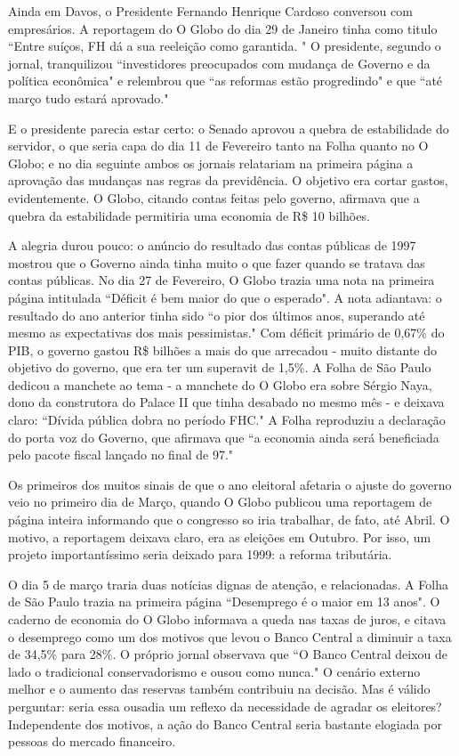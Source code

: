 \documentclass{article}
\begin{document}
Ainda em Davos, o Presidente Fernando Henrique Cardoso conversou com empresários. A reportagem do O Globo do dia 29 de Janeiro tinha como titulo ``Entre suíços, FH dá a sua reeleição como garantida. " O presidente, segundo o jornal, tranquilizou ``investidores preocupados com mudança de Governo e da política econômica" e relembrou que ``as reformas estão progredindo" e que ``até março tudo estará aprovado."

E o presidente parecia estar certo: o Senado aprovou a quebra de estabilidade do servidor, o que seria capa do dia 11 de Fevereiro tanto na Folha quanto no O Globo; e no dia seguinte ambos os jornais relatariam na primeira página a aprovação das mudanças nas regras da previdência. O objetivo era cortar gastos, evidentemente. O Globo, citando contas feitas pelo governo, afirmava que a quebra da estabilidade permitiria uma economia de R\$ 10 bilhões.                     

A alegria durou pouco: o anúncio do resultado das contas públicas de 1997 mostrou que o Governo ainda tinha muito o que fazer quando se tratava das contas públicas. No dia 27 de Fevereiro, O Globo trazia uma nota na primeira página intitulada ``Déficit é bem maior do que o esperado". A nota adiantava: o resultado do ano anterior tinha sido ``o pior dos últimos anos, superando até mesmo as expectativas dos mais pessimistas." Com déficit primário de 0,67\% do PIB, o governo gastou R\$ bilhões a mais do que arrecadou - muito distante do objetivo do governo, que era ter um superavit de 1,5\%. A Folha de São Paulo dedicou a manchete ao tema - a manchete do O Globo era sobre Sérgio Naya, dono da construtora do Palace II que tinha desabado no mesmo mês - e deixava claro: ``Dívida pública dobra no período FHC." A Folha reproduziu a declaração do porta voz do Governo, que afirmava que ``a economia ainda será beneficiada pelo pacote fiscal lançado no final de 97."

Os primeiros dos muitos sinais de que o ano eleitoral afetaria o ajuste do governo veio no primeiro dia de Março, quando O Globo publicou uma reportagem de página inteira informando que o congresso so iria trabalhar, de fato, até Abril. O motivo, a reportagem deixava claro, era as eleições em Outubro. Por isso, um projeto importantíssimo seria deixado para 1999: a reforma tributária.

O dia 5 de março traria duas notícias dignas de atenção, e relacionadas. A Folha de São Paulo trazia na primeira página ``Desemprego é o maior em 13 anos". O caderno de economia do O Globo informava a queda nas taxas de juros, e citava o desemprego como um dos motivos que levou o Banco Central a diminuir a taxa de 34,5\% para 28\%. O próprio jornal observava que ``O Banco Central deixou de lado o tradicional conservadorismo e ousou como nunca." O cenário externo melhor e o aumento das reservas também contribuiu na decisão. Mas é válido perguntar: seria essa ousadia um reflexo da necessidade de agradar os eleitores? Independente dos motivos, a ação do Banco Central seria bastante elogiada por pessoas do mercado financeiro.
\end{document}
